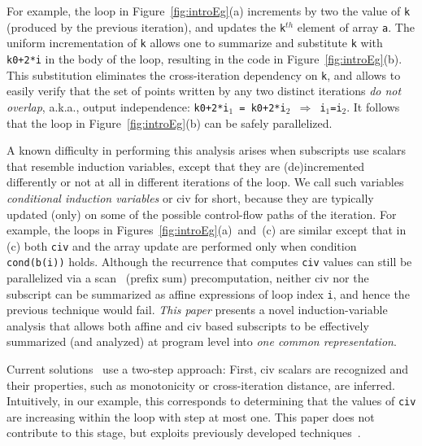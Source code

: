 \documentclass{sig-alternate}
\begin{document}
For example, the loop in Figure~\ref{fig:introEg}(a) increments
by two the value of {\tt k} (produced by the previous iteration),
and updates the {\tt k$^{th}$} element of array {\tt a}. 
%
The uniform incrementation of {\tt k} allows one to summarize and
substitute {\tt k} with {\tt k0+2*i} in the body of the loop, 
resulting in the code in Figure~\ref{fig:introEg}(b).
%
This substitution eliminates the cross-iteration dependency on {\tt k}, 
and allows to easily verify that the set of points written by any
two distinct iterations {\em do not overlap}, a.k.a., output independence: 
{\tt k0+2*i$_1$~=~k0+2*i$_2$ $\Rightarrow$ i$_1$=i$_2$}. 
It follows that the loop in Figure~\ref{fig:introEg}(b) can be safely
parallelized. 

\enlargethispage{\baselineskip}

A known difficulty in performing this analysis arises when
subscripts use scalars that resemble induction variables, except 
that they are (de)incremented differently or not at all in 
different iterations of the loop.  We call such variables 
{\em conditional induction variables} or {\sc civ} for short,
because they are typically updated  (only) on some of 
the possible control-flow paths of the iteration.
%
For example, the loops in Figures~\ref{fig:introEg}(a)~and~(c) are 
similar except that in (c) both {\tt civ} and the array update are 
performed only when condition {\tt cond(b(i))} holds.  
Although the recurrence that computes {\tt civ} values can still 
be parallelized via a scan~\cite{segScan} (prefix sum) precomputation, 
neither {\sc civ} nor the subscript can be summarized as affine 
expressions of loop index {\tt i}, and hence the previous technique 
would fail.  
% 
{\em This paper} presents a novel induction-variable analysis that allows
both affine and {\sc civ} based subscripts to be effectively summarized
(and analyzed) at program level into {\em one common representation}.


Current solutions~\cite{Blume94RangeTest,SeqVars,VEG,PaduaDemDrInterproc,CohenBeyondMon} %
use a two-step approach:
First, {\sc civ} scalars are recognized and their properties, such as 
monotonicity or cross-iteration distance, are inferred.   
Intuitively, in our example, this corresponds to determining that 
the values of {\tt civ} are increasing within the loop with step 
at most one.
This paper does not contribute to this stage, but  
exploits previously developed techniques~\cite{VEG}.
\end{document}
